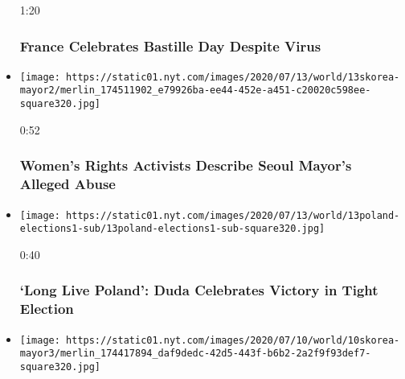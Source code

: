 \begin{itemize}
  1:20

  \hypertarget{france-celebrates-bastille-day-despite-virus}{%
  \subsubsection{France Celebrates Bastille Day Despite
  Virus}\label{france-celebrates-bastille-day-despite-virus}}
\item
  \href{https://www.nytimes.com/video/us/100000007236404/seoul-mayor-abuse-sexual-harassment.html?action=click\&module=video-series-bar\&region=header\&pgtype=Article\&playlistId=video/world}{}

  \texttt{[image: https://static01.nyt.com/images/2020/07/13/world/13skorea-mayor2/merlin\_174511902\_e79926ba-ee44-452e-a451-c20020c598ee-square320.jpg]}

  0:52

  \hypertarget{womens-rights-activists-describe-seoul-mayors-alleged-abuse}{%
  \subsubsection{Women's Rights Activists Describe Seoul Mayor's Alleged
  Abuse}\label{womens-rights-activists-describe-seoul-mayors-alleged-abuse}}
\item
  \href{https://www.nytimes.com/video/world/europe/100000007236353/poland-election-duda-victory-speech.html?action=click\&module=video-series-bar\&region=header\&pgtype=Article\&playlistId=video/world}{}

  \texttt{[image: https://static01.nyt.com/images/2020/07/13/world/13poland-elections1-sub/13poland-elections1-sub-square320.jpg]}

  0:40

  \hypertarget{long-live-poland-duda-celebrates-victory-in-tight-election}{%
  \subsubsection{`Long Live Poland': Duda Celebrates Victory in Tight
  Election}\label{long-live-poland-duda-celebrates-victory-in-tight-election}}
\item
  \href{https://www.nytimes.com/video/us/100000007233462/seoul-officials-read-mayor-note.html?action=click\&module=video-series-bar\&region=header\&pgtype=Article\&playlistId=video/world}{}

  \texttt{[image: https://static01.nyt.com/images/2020/07/10/world/10skorea-mayor3/merlin\_174417894\_daf9dedc-42d5-443f-b6b2-2a2f9f93def7-square320.jpg]}


\end{itemize}
